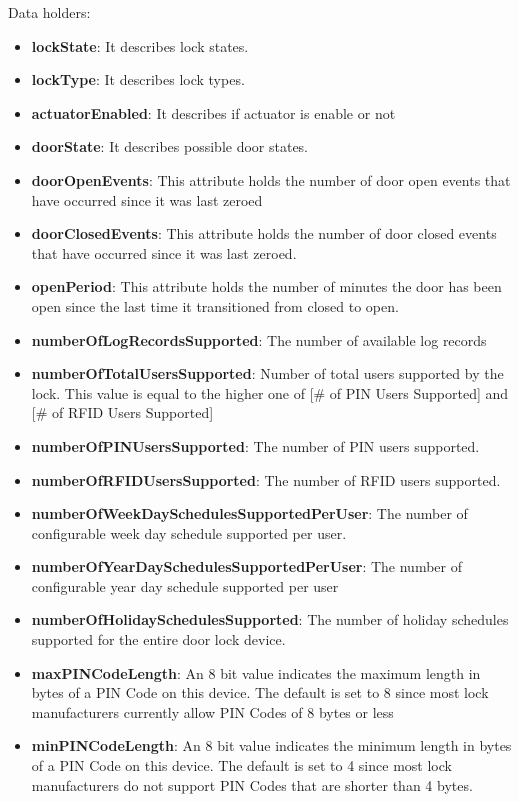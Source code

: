 \noindent
Data holders:

\begin{itemize}
\item \textbf{lockState}: It describes lock states.
\item \textbf{lockType}: It describes lock types.
\item \textbf{actuatorEnabled}: It describes if actuator is enable or not
\item \textbf{doorState}: It describes possible door states.
\item \textbf{doorOpenEvents}: This attribute holds the number of door open events that have occurred since it was last zeroed
\item \textbf{doorClosedEvents}: This attribute holds the number of door closed events that have occurred since it was last zeroed.
\item \textbf{openPeriod}: This attribute holds the number of minutes the door has been open since the last time it transitioned from closed to open.
\item \textbf{numberOfLogRecordsSupported}: The number of available log records
\item \textbf{numberOfTotalUsersSupported}: Number of total users supported by the lock. This value is equal to the higher one of [\# of PIN Users Supported] and [\# of RFID Users Supported]
\item \textbf{numberOfPINUsersSupported}: The number of PIN users supported.
\item \textbf{numberOfRFIDUsersSupported}: The number of RFID users supported.
\item \textbf{numberOfWeekDaySchedulesSupportedPerUser}: The number of configurable week day schedule supported per user.
\item \textbf{numberOfYearDaySchedulesSupportedPerUser}: The number of configurable year day schedule supported per user
\item \textbf{numberOfHolidaySchedulesSupported}: The number of holiday schedules supported for the entire door lock device.
\item \textbf{maxPINCodeLength}: An 8 bit value indicates the maximum length in bytes of a PIN Code on this device. The default is set to 8 since most lock manufacturers currently allow PIN Codes of 8 bytes or less
\item \textbf{minPINCodeLength}: An 8 bit value indicates the minimum length in bytes of a PIN Code on this device. The default is set to 4 since most lock manufacturers do not support PIN Codes that are shorter than 4 bytes.

\end{itemize}
